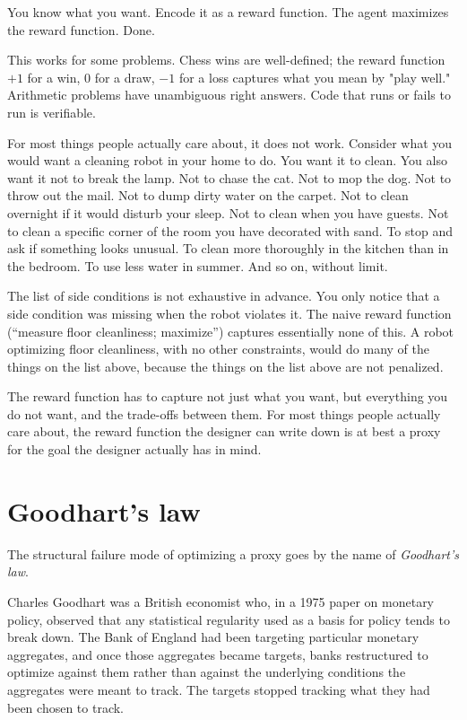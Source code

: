 You know what you want. Encode it as a reward function. The agent maximizes the reward function. Done.

This works for some problems. Chess wins are well-defined; the reward function $+1$ for a win, $0$ for a draw, $-1$ for a loss captures what you mean by "play well." Arithmetic problems have unambiguous right answers. Code that runs or fails to run is verifiable.

For most things people actually care about, it does not work. Consider what you would want a cleaning robot in your home to do. You want it to clean. You also want it not to break the lamp. Not to chase the cat. Not to mop the dog. Not to throw out the mail. Not to dump dirty water on the carpet. Not to clean overnight if it would disturb your sleep. Not to clean when you have guests. Not to clean a specific corner of the room you have decorated with sand. To stop and ask if something looks unusual. To clean more thoroughly in the kitchen than in the bedroom. To use less water in summer. And so on, without limit.

The list of side conditions is not exhaustive in advance. You only notice that a side condition was missing when the robot violates it. The naive reward function (``measure floor cleanliness; maximize'') captures essentially none of this. A robot optimizing floor cleanliness, with no other constraints, would do many of the things on the list above, because the things on the list above are not penalized.

The reward function has to capture not just what you want, but everything you do not want, and the trade-offs between them. For most things people actually care about, the reward function the designer can write down is at best a proxy for the goal the designer actually has in mind.

\section*{Goodhart's law}

The structural failure mode of optimizing a proxy goes by the name of \emph{Goodhart's law}.

Charles Goodhart was a British economist who, in a 1975 paper on monetary policy, observed that any statistical regularity used as a basis for policy tends to break down. The Bank of England had been targeting particular monetary aggregates, and once those aggregates became targets, banks restructured to optimize against them rather than against the underlying conditions the aggregates were meant to track. The targets stopped tracking what they had been chosen to track.


